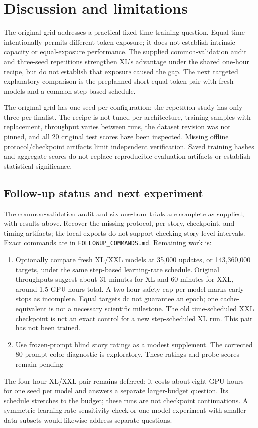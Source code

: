 \documentclass[12pt]{article}
\begin{document}
\section{Discussion and limitations}
The original grid addresses a practical fixed-time training question. Equal time
intentionally permits different token exposure; it does not establish intrinsic
capacity or equal-exposure performance. The supplied common-validation audit and
three-seed repetitions strengthen XL's advantage under the shared one-hour recipe,
but do not establish that exposure caused the gap. The next targeted explanatory
comparison is the preplanned short equal-token pair with fresh models and a common
step-based schedule.

The original grid has one seed per configuration; the repetition study has only
three per finalist. The recipe is not tuned per architecture, training samples
with replacement, throughput varies between runs, the dataset revision was not
pinned, and all 20 original test scores have been inspected. Missing offline
protocol/checkpoint artifacts limit independent verification. Saved training hashes
and aggregate scores do not replace reproducible evaluation artifacts or establish
statistical significance.

\subsection{Follow-up status and next experiment}
The common-validation audit and six one-hour trials are complete as supplied, with
results above. Recover the missing protocol, per-story, checkpoint, and timing
artifacts; the local exports do not support checking story-level intervals.
Exact commands are in \texttt{FOLLOWUP\_COMMANDS.md}. Remaining work is:
\begin{enumerate}
\item Optionally compare fresh XL/XXL models at 35{,}000 updates, or
143{,}360{,}000 targets, under the same step-based learning-rate schedule. Original
throughputs suggest about 31 minutes for XL and 60 minutes for XXL, around 1.5
GPU-hours total. A two-hour safety cap per model marks early stops as incomplete.
Equal targets do not guarantee an epoch; one cache-equivalent is not a necessary
scientific milestone. The old time-scheduled XXL checkpoint is not an exact control
for a new step-scheduled XL run. This pair has not been trained.
\item Use frozen-prompt blind story ratings as a modest supplement. The corrected
80-prompt color diagnostic is exploratory. These ratings and probe scores remain pending.
\end{enumerate}
The four-hour XL/XXL pair remains deferred: it costs about eight GPU-hours for one
seed per model and answers a separate larger-budget question. Its schedule stretches
to the budget; these runs are not checkpoint continuations. A symmetric
learning-rate sensitivity check or one-model experiment with smaller data subsets
would likewise address separate questions.
\end{document}
